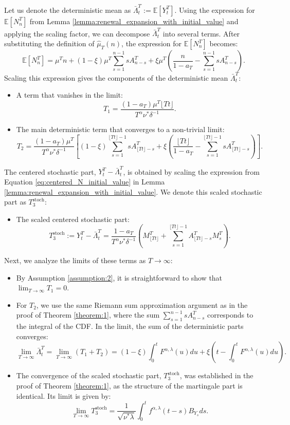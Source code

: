 \documentclass[letterpaper]{article}
\numberwithin{equation}{section}
\theoremstyle{definition}
\theoremstyle{remark}
\begin{document}
Let us denote the deterministic mean as $\bar{\Lambda}_t^T := \mathbb{E}[Y_t^T]$. Using the expression for $\mathbb{E}[N_n^T]$ from Lemma \ref{lemma:renewal_expansion_with_initial_value} and applying the scaling factor, we can decompose $\bar{\Lambda}_t^T$ into several terms. After substituting the definition of $\hat{\mu}_T(n)$, the expression for $\mathbb{E}[N_n^T]$ becomes:
\[
\mathbb{E}[N_n^T] = \mu^T n + (1-\xi)\mu^T \sum_{s=1}^{n-1}sA_{n-s}^T + \xi\mu^T \left( \frac{n}{1-a_T} - \sum_{s=1}^{n-1}sA_{n-s}^T \right).
\]
Scaling this expression gives the components of the deterministic mean $\bar{\Lambda}_t^T$:
\begin{itemize}
    \item A term that vanishes in the limit:
        \[
            T_1 = \frac{(1-a_T)\mu^T \lfloor Tt \rfloor}{T^\alpha \nu^*\delta^{-1}}.
        \]
    \item The main deterministic term that converges to a non-trivial limit:
        \[
            T_2 = \frac{(1-a_T)\mu^T}{T^\alpha \nu^*\delta^{-1}} \left[ (1-\xi) \sum_{s=1}^{\lfloor Tt \rfloor-1}sA_{\lfloor Tt \rfloor-s}^T + \xi \left( \frac{\lfloor Tt \rfloor}{1-a_T} - \sum_{s=1}^{\lfloor Tt \rfloor-1}sA_{\lfloor Tt \rfloor-s}^T \right) \right].
        \]
\end{itemize}
The centered stochastic part, $Y_t^T - \bar{\Lambda}_t^T$, is obtained by scaling the expression from Equation \eqref{eq:centered_N_initial_value} in Lemma \ref{lemma:renewal_expansion_with_initial_value}. We denote this scaled stochastic part as $T_3^{\text{stoch}}$:
\begin{itemize}
    \item The scaled centered stochastic part:
        \[
            T_3^{\text{stoch}} := Y_t^T - \bar{\Lambda}_t^T = \frac{1-a_T}{T^\alpha \nu^*\delta^{-1}} \left( M_{\lfloor Tt \rfloor}^T + \sum_{s=1}^{\lfloor Tt \rfloor-1} A_{\lfloor Tt \rfloor-s}^T M_s^T \right).
        \]
\end{itemize}
Next, we analyze the limits of these terms as $T \to \infty$:
\begin{itemize}
    \item By Assumption \ref{assumption:2}, it is straightforward to show that $\lim_{T\to\infty} T_1 = 0$.
    \item For $T_2$, we use the same Riemann sum approximation argument as in the proof of Theorem \ref{theorem:1}, where the sum $\sum_{s=1}^{n-1} s A_{n-s}^T$ corresponds to the integral of the CDF. In the limit, the sum of the deterministic parts converges:
    \[
    \lim_{T\to\infty} \bar{\Lambda}_t^T = \lim_{T\to\infty} (T_1 + T_2) = (1-\xi)\int_0^t F^{\alpha,\lambda}(u)du + \xi \left( t - \int_0^t F^{\alpha,\lambda}(u)du \right).
    \]
    \item The convergence of the scaled stochastic part, $T_3^{\text{stoch}}$, was established in the proof of Theorem \ref{theorem:1}, as the structure of the martingale part is identical. Its limit is given by:
    \[
    \lim_{T\to\infty} T_3^{\text{stoch}} = \frac{1}{\sqrt{\nu^* \lambda}} \int_0^t f^{\alpha,\lambda}(t-s) B_{Y_s} ds.
    \]
\end{itemize}
\end{document}
